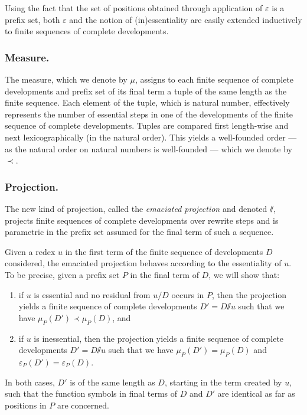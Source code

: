 \documentclass{LMCS}
\theoremstyle{definition}
\newcommand{\emmy}{\mathord{\sslash}}
\newcommand{\pmap}{\varepsilon}
\newcommand{\pmapp}[2]{\pmap_{#1}({#2})}
\newcommand{\pme}{\mu}
\newcommand{\pmep}[2]{\pme_{#1}({#2})}
\begin{document}
Using the fact that the set of positions obtained through application of $\pmap$ is a prefix set, both $\pmap$ and the notion of (in)essentiality are easily extended inductively to finite sequences of complete developments.

\subsubsection*{Measure.} 

The measure, which we denote by $\pme$, assigns to each finite sequence of complete developments and prefix set of its final term a tuple of the same length as the finite sequence. Each element of the tuple, which is natural number, effectively represents the number of essential steps in one of the developments of the finite sequence of complete developments. Tuples are compared first length-wise and next lexicographically (in the natural order). This yields a well-founded order --- as the natural order on natural numbers is well-founded --- which we denote by $\prec$.

\subsubsection*{Projection.}

The new kind of projection, called the \emph{emaciated projection} and denoted $\emmy$, projects finite sequences of complete developments over rewrite steps and is parametric in the prefix set assumed for the final term of such a sequence.

Given a redex $u$ in the first term of the finite sequence of developments $D$ considered, the emaciated projection behaves according to the essentiality of $u$. To be precise, given a prefix set $P$ in the final term of $D$, we will show that:

\begin{enumerate}[(1)]
\item
if $u$ is essential and no residual from $u/D$ occurs in $P$, then the projection yields a finite sequence of complete developments $D' = D \emmy u$ such that we have $\pmep{P}{D'} \prec \pmep{P}{D}$, and
\item
if $u$ is inessential, then the projection yields a finite sequence of complete developments $D' = D \emmy u$ such that we have $\pmep{P}{D'} = \pmep{P}{D}$ and $\pmapp{P}{D'} = \pmapp{P}{D}$.
\end{enumerate}

In both cases, $D'$ is of the same length as $D$, starting in the term created by $u$, such that the function symbols in final terms of $D$ and $D'$ are identical as far as positions in $P$ are concerned.
\end{document}
